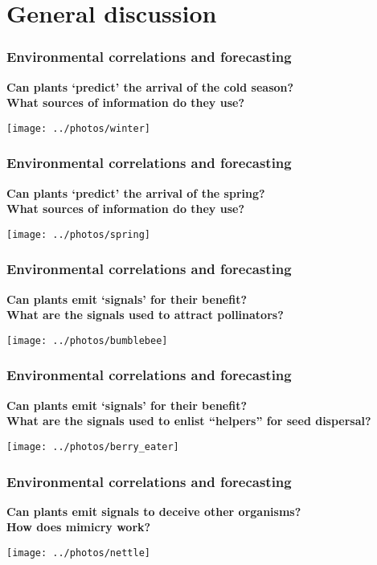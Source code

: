 \section{General discussion}

\begin{frame}
\frametitle{Environmental correlations and forecasting \Discussion}

\textbf{Can plants `predict' the arrival of the cold season?\\
 What sources of information do they use?}

    \centering
    \texttt{[image: ../photos/winter]}
\end{frame}

\begin{frame}
\frametitle{Environmental correlations and forecasting \Discussion}

\textbf{Can plants `predict' the arrival of the spring?\\
 What sources of information do they use?}

    \centering
    \texttt{[image: ../photos/spring]}
\end{frame}

\begin{frame}
\frametitle{Environmental correlations and forecasting \Discussion}

\textbf{Can plants emit `signals' for their benefit?\\
What are the signals used to attract pollinators?}

    \centering
    \texttt{[image: ../photos/bumblebee]}
\end{frame}

\begin{frame}
\frametitle{Environmental correlations and forecasting \Discussion}

\textbf{Can plants emit `signals' for their benefit?\\
What are the signals used to enlist ``helpers'' for seed dispersal?}

    \centering
    \texttt{[image: ../photos/berry\_eater]}
\end{frame}

\begin{frame}
\frametitle{Environmental correlations and forecasting \Discussion}

\textbf{Can plants emit signals to deceive other organisms?\\
How does mimicry work?}

    \centering
    \texttt{[image: ../photos/nettle]}
\end{frame}

